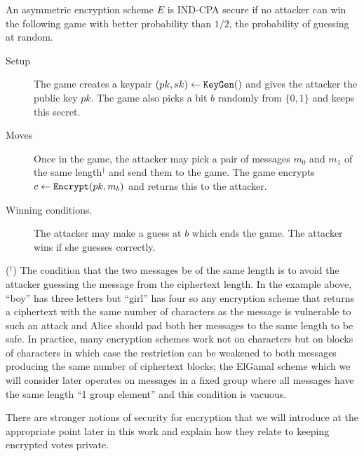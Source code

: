\documentclass[envcountsame]{llncs}
\newcommand{\alg}[1]{\textup{\texttt{#1}}}
\begin{document}
\begin{definition}
An asymmetric encryption scheme $E$ is IND-CPA secure if no attacker can win the
following game with better probability than $1/2$, the probability of guessing
at random.

\begin{description}
\item[Setup] The game creates a keypair $(pk, sk) \gets \alg{KeyGen}()$ and
gives the attacker the public key $pk$. The game also picks a bit $b$ randomly
from $\{0, 1\}$ and keeps this secret.
\item[Moves] Once in the game, the attacker may pick a pair of messages $m_0$
and $m_1$ of the same length$^\dagger$ and send them to the game. The game
encrypts $c \gets \alg{Encrypt} (pk, m_b)$ and returns this to the attacker.
\item[Winning conditions.] The attacker may make a guess at $b$ which ends the
game. The attacker wins if she guesses correctly.
\end{description}
\end{definition}

\noindent($^\dagger$) The condition that the two messages be of the same length
is to avoid the attacker guessing the message from the ciphertext length. In the
example above, ``boy'' has three letters but ``girl'' has four so any encryption
scheme that returns a ciphertext with the same number of characters as the
message is vulnerable to such an attack and Alice should pad both her messages
to the same length to be safe. In practice, many encryption schemes work not on
characters but on blocks of characters in which case the restriction can be
weakened to both messages producing the same number of ciphertext blocks; the
ElGamal scheme which we will consider later operates on messages in a fixed
group where all messages have the same length ``1 group element'' and this
condition is vacuous.

There are stronger notions of security for encryption that we will introduce at
the appropriate point later in this work and explain how they relate to keeping
encrypted votes private.
\end{document}
